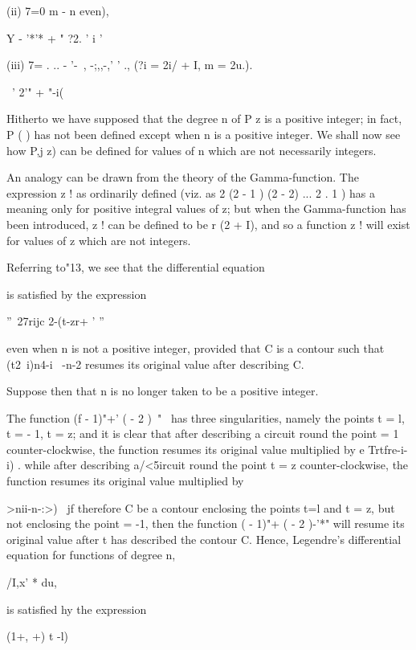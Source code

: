 {(ii) 7=0 m - n even),

Y - '*'* + " ?2. ' i '

(iii) 7= . .. - '-~, -;,,-,' ' ., (?i = 2i/ + I, m = 2u.).

\ ' 2'" + "-i(%


Hitherto we have supposed that the degree n of P z is a positive
integer; in fact, P ( ) has not been defined except when n is a
positive integer. We shall now see how P,j z) can be defined for
values of n which are not necessarily integers.

An analogy can be drawn from the theory of the Gamma-function. The
expression z ! as ordinarily defined (viz. as 2 (2 - 1 ) (2 - 2) ... 2
. 1 ) has a meaning only for positive integral values of z; but when
the Gamma-function has been introduced, z ! can be defined to be r (2
+ I), and so a function z ! will exist for values of z which are not
integers.

Referring to"13, we see that the differential equation

is satisfied by the expression

''~27rijc 2-(t-zr+ ' ''

even when n is not a positive integer, provided that C is a contour
such that (t2\ i)n4-i \ -n-2 resumes its original value after
describing C.

Suppose then that n is no longer taken to be a positive integer.

The function (f - 1)"+' ( - 2 )~"~ has three singularities, namely the
points t = l, t = - 1, t = z; and it is clear that after describing a
circuit round the point = 1 counter-clockwise, the function resumes
its original value multiplied by e Trtfre-i-i) . while after
describing a/<5ircuit round the point t = z counter-clockwise, the
function resumes its original value multiplied by

%
%

  >nii-n-:>) \ jf therefore C be a contour enclosing the points t=l
and t = z, but not enclosing the point = -1, then the function ( -
1)"+ ( - 2 )-'*" will resume its original value after t has described
the contour C. Hence, Legendre's differential equation for functions
of degree n,

/I,x' * du,

is satisfied hy the expression

(1+, +) t -l)

}
